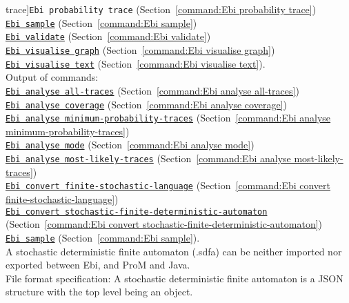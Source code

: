 {trace]{\texttt{Ebi probability trace}} (Section~\ref{command:Ebi probability trace})\\\null\qquad\hyperref[command:Ebi sample]{\texttt{Ebi sample}} (Section~\ref{command:Ebi sample})\\\null\qquad\hyperref[command:Ebi validate]{\texttt{Ebi validate}} (Section~\ref{command:Ebi validate})\\\null\qquad\hyperref[command:Ebi visualise graph]{\texttt{Ebi visualise graph}} (Section~\ref{command:Ebi visualise graph})\\\null\qquad\hyperref[command:Ebi visualise text]{\texttt{Ebi visualise text}} (Section~\ref{command:Ebi visualise text}).
\\Output of commands: \\\null\qquad\hyperref[command:Ebi analyse all-traces]{\texttt{Ebi analyse all-traces}} (Section~\ref{command:Ebi analyse all-traces})\\\null\qquad\hyperref[command:Ebi analyse coverage]{\texttt{Ebi analyse coverage}} (Section~\ref{command:Ebi analyse coverage})\\\null\qquad\hyperref[command:Ebi analyse minimum-probability-traces]{\texttt{Ebi analyse minimum-probability-traces}} (Section~\ref{command:Ebi analyse minimum-probability-traces})\\\null\qquad\hyperref[command:Ebi analyse mode]{\texttt{Ebi analyse mode}} (Section~\ref{command:Ebi analyse mode})\\\null\qquad\hyperref[command:Ebi analyse most-likely-traces]{\texttt{Ebi analyse most-likely-traces}} (Section~\ref{command:Ebi analyse most-likely-traces})\\\null\qquad\hyperref[command:Ebi convert finite-stochastic-language]{\texttt{Ebi convert finite-stochastic-language}} (Section~\ref{command:Ebi convert finite-stochastic-language})\\\null\qquad\hyperref[command:Ebi convert stochastic-finite-deterministic-automaton]{\texttt{Ebi convert stochastic-finite-deterministic-automaton}} (Section~\ref{command:Ebi convert stochastic-finite-deterministic-automaton})\\\null\qquad\hyperref[command:Ebi sample]{\texttt{Ebi sample}} (Section~\ref{command:Ebi sample}).
\\A stochastic deterministic finite automaton (.sdfa) can be neither imported nor exported between Ebi, and ProM and Java.
\\File format specification:
A stochastic deterministic finite automaton is a JSON structure with the top level being an object.
}
